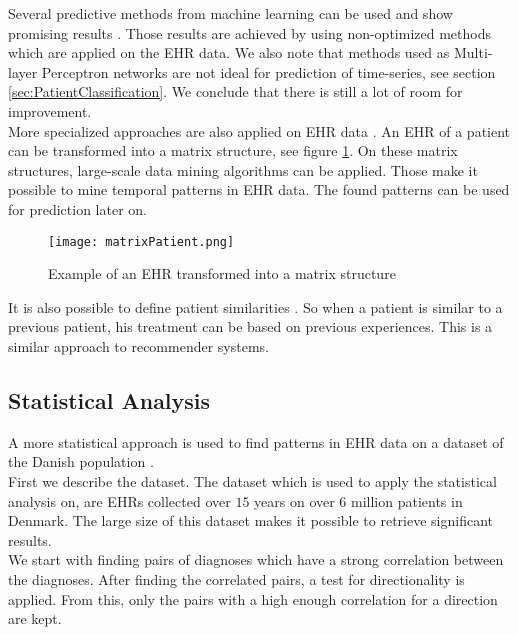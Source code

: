 Several predictive methods from machine learning can be used and show promising results \cite{EHRmining:article}. Those results are achieved by using non-optimized methods which are applied on the EHR data. We also note that methods used as Multi-layer Perceptron networks are not ideal for prediction of time-series, see section \ref{sec:PatientClassification}. We conclude that there is still a lot of room for improvement. \\
 
More specialized approaches are also applied on EHR data \cite{EHRrecommender:article}. 
An EHR of a patient can be transformed into a matrix structure, see figure \ref{fig:matrixPatient}. On these matrix structures, large-scale data mining algorithms can be applied. Those make it possible to mine temporal patterns in EHR data. The found patterns can be used for prediction later on.

\begin{figure}[H]
	\centering
	\texttt{[image: matrixPatient.png]}
	\caption{Example of an EHR transformed into a matrix structure \cite{EHRrecommender:article}}
	\label{fig:matrixPatient}
\end{figure}

It is also possible to define patient similarities \cite{EHRsimilarity:article}. So when a patient is similar to a previous patient, his treatment can be based on previous experiences. This is a similar approach to recommender systems.


\subsection{Statistical Analysis}

A more statistical approach is used to find patterns in EHR data on a dataset of the Danish population \cite{Brunak:article}. \\

First we describe the dataset. The dataset which is used to apply the statistical analysis on, are EHRs collected over $15$ years on over $6$ million patients in Denmark. The large size of this dataset makes it possible to retrieve significant results. \\

We start with finding pairs of diagnoses which have a strong correlation between the diagnoses. After finding the correlated pairs, a test for directionality is applied. From this, only the pairs with a high enough correlation for a direction are kept. \\


